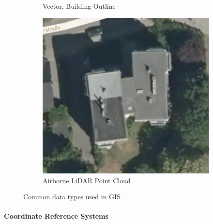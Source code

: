 \begin{figure}[!htb]
\begin{subfigure}[t]{.30\linewidth}
    \caption{\label{fig:ch1_gis_type_b}Vector, Building Outline}
  \end{subfigure}
  \begin{subfigure}[t]{.30\linewidth}
    \centering\includegraphics[page=3,clip,trim=0cm 0cm 0cm 0cm,width=.99\linewidth]{chapter_1_intro/imgs/gis_types.pdf}
    \caption{\label{fig:ch1_gis_type_c}Airborne LiDAR Point Cloud}
  \end{subfigure}
  \caption[Common data types used in GIS]{Common data types used in \ac{GIS}}\label{fig:ch1_gis_types}
\end{figure}

\paragraph{Coordinate Reference Systems}


